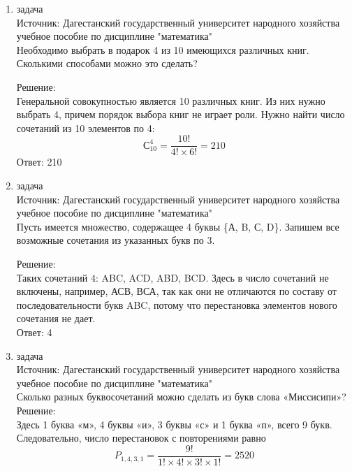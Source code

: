 \documentclass[a4paper,14pt]{extreport} %
\begin{document}
\begin{center}
\begin{enumerate}
						 \item {\large задача }\\
						 Источник: Дагестанский государственный университет народного хозяйства учебное пособие по дисциплине "математика"  \\
						 \vspace{15pt}
						 Необходимо выбрать в подарок 4 из 10 имеющихся
						 различных книг. Сколькими способами можно это сделать?\\
						 \vspace{15pt}
						 
						 Решение:\\
						 Генеральной совокупностью является 10 различных
						 книг. Из них нужно выбрать 4, причем порядок выбора книг не играет
						 роли. Нужно найти число сочетаний из 10 элементов по 4:
						 \begin{equation}
						 	С_{10}^4 = \frac{10!}{4!\times6!} = 210
						 \end{equation}
						 Ответ: 210
						 
						 \item {\large задача }\\
						 Источник: Дагестанский государственный университет народного хозяйства учебное пособие по дисциплине "математика"  \\
						 \vspace{15pt}
						 Пусть имеется множество, содержащее 4 буквы \{А, B, С,
						 	D\}. Запишем все возможные сочетания из указанных букв по 3.\\
						 \vspace{15pt}
						 
						 Решение:\\
						 Таких сочетаний 4: ABC, ACD, ABD, BCD. Здесь в число
						 сочетаний не включены, например, АСВ, ВСА, так как они не
						 отличаются по составу от последовательности букв ABC, потому что
						 перестановка элементов нового сочетания не дает.\\
						 Ответ: 4
						 
						 \item {\large задача }\\
						 Источник: Дагестанский государственный университет народного хозяйства учебное пособие по дисциплине "математика"  \\
						 \vspace{15pt}
						 Сколько разных буквосочетаний можно сделать из букв
						 слова «Миссисипи»?\\
						 \vspace{15pt}
						 \newpage
						 Решение:\\
						 Здесь 1 буква «м», 4 буквы «и», 3 буквы «с» и 1 буква
						 «п», всего 9 букв.
						 Следовательно, число перестановок с повторениями равно
						 \begin{equation}
						 	P_{1,4,3,1} = \frac{9!}{1! \times 4! \times 3! \times 1!} = 2520
						 \end{equation}
						 

\end{enumerate}
\end{center}
\end{document}

